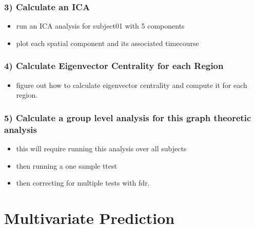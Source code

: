 \documentclass[letterpaper,10pt,english]{sphinxmanual}
\begin{document}
\subsubsection{3) Calculate an ICA}
\label{\detokenize{content/Connectivity:calculate-an-ica}}\begin{itemize}
\item {} 
run an ICA analysis for subject01 with 5 components

\item {} 
plot each spatial component and its associated timecourse

\end{itemize}


\subsubsection{4) Calculate Eigenvector Centrality for each Region}
\label{\detokenize{content/Connectivity:calculate-eigenvector-centrality-for-each-region}}\begin{itemize}
\item {} 
figure out how to calculate eigenvector centrality and compute it for each region.

\end{itemize}


\subsubsection{5) Calculate a group level analysis for this graph theoretic analysis}
\label{\detokenize{content/Connectivity:calculate-a-group-level-analysis-for-this-graph-theoretic-analysis}}\begin{itemize}
\item {} 
this will require running this analysis over all subjects

\item {} 
then running a one sample t\sphinxhyphen{}test

\item {} 
then correcting for multiple tests with fdr.

\end{itemize}


\section{Multivariate Prediction}
\label{\detokenize{content/Multivariate_Prediction:multivariate-prediction}}\label{\detokenize{content/Multivariate_Prediction::doc}}
\end{document}
